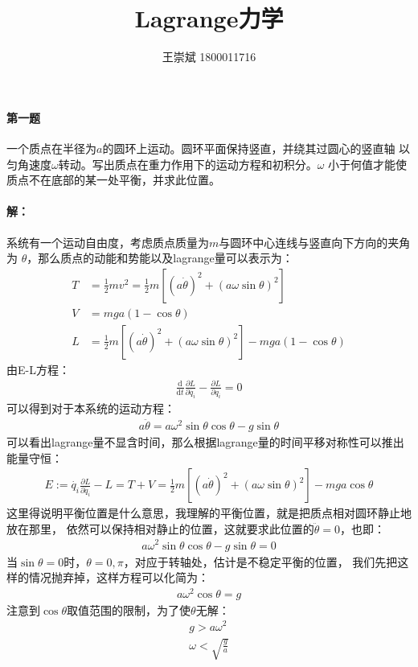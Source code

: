 \documentclass[a4paper]{ctexart}
\title{\textbf{Lagrange力学}}
\author{王崇斌 1800011716}
\date{}
\def\d{\mathrm{d}}
\begin{document}
    \pagestyle{fancy}
	\chead{}
	\rhead{}
	\maketitle
    \thispagestyle{fancy}
    \paragraph{第一题}
    一个质点在半径为$a$的圆环上运动。圆环平面保持竖直，并绕其过圆心的竖直轴
    以匀角速度$\omega$转动。写出质点在重力作用下的运动方程和初积分。$\omega$
    小于何值才能使质点不在底部的某一处平衡，并求此位置。
    \paragraph{解：}
    系统有一个运动自由度，考虑质点质量为$m$与圆环中心连线与竖直向下方向的夹角为
    $\theta$，那么质点的动能和势能以及lagrange量可以表示为：
    \begin{align}
        T &= \frac{1}{2}mv^{2} = \frac{1}{2}m\left[(a\dot{\theta})^{2} + (a\omega \sin\theta)^{2}\right]\\
        V &= mga(1 - \cos\theta)\\
        L &= \frac{1}{2}m\left[(a\dot{\theta})^{2} + (a\omega \sin\theta)^{2}\right] - mga(1 - \cos\theta)
    \end{align}
    由E-L方程：
    \begin{align}
        \frac{\d }{\d t}\frac{\partial L}{\partial\dot{q_{i}}} - \frac{\partial L}{\partial q_{i}} = 0
    \end{align}
    可以得到对于本系统的运动方程：
    \begin{align}
        a\ddot{\theta} = a\omega^{2}\sin\theta\cos\theta - g\sin\theta
    \end{align}
    可以看出lagrange量不显含时间，那么根据lagrange量的时间平移对称性可以推出能量守恒：
    \begin{align}
        E := \dot{q_{i}}\frac{\partial L}{\partial \dot{q_{i}}} - L = T + V = \frac{1}{2}m\left[(a\dot{\theta})^{2} + (a\omega \sin\theta)^{2}\right]  - mga \cos\theta
    \end{align}
    这里得说明平衡位置是什么意思，我理解的平衡位置，就是把质点相对圆环静止地放在那里，
    依然可以保持相对静止的位置，这就要求此位置的$\ddot{\theta}=0$，也即：
    \begin{align}
        a\omega^{2}\sin\theta\cos\theta - g\sin\theta = 0
    \end{align}
    当$\sin\theta = 0$时，$\theta = 0, \pi$，对应于转轴处，估计是不稳定平衡的位置，
    我们先把这样的情况抛弃掉，这样方程可以化简为：
    \begin{align}
        a\omega^{2}\cos\theta = g
    \end{align}
    注意到$\cos\theta$取值范围的限制，为了使$\theta$无解：
    \begin{align}
        g > a\omega^{2}\\
        \omega < \sqrt{\frac{g}{a}}
    \end{align}
\end{document}
